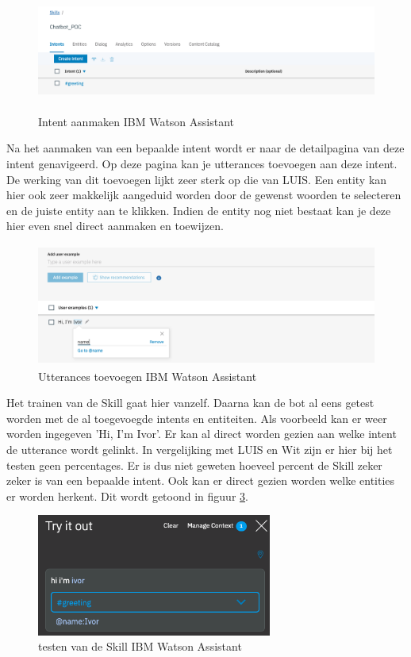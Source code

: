 \begin{figure}[h!]
	\centering
	\includegraphics[height=4cm]{img/ibm_intents.png}
	\caption{Intent aanmaken IBM Watson Assistant}
	\label{fig:intentsIbm}
\end{figure}

Na het aanmaken van een bepaalde intent wordt er naar de detailpagina van deze intent genavigeerd. Op deze pagina kan je utterances toevoegen aan deze intent. De werking van dit toevoegen lijkt zeer sterk op die van LUIS. Een entity kan hier ook zeer makkelijk aangeduid worden door de gewenst woorden te selecteren en de juiste entity aan te klikken. Indien de entity nog niet bestaat kan je deze hier even snel direct aanmaken en toewijzen.

\begin{figure}[h!]
	\centering
	\includegraphics[height=4cm]{img/imb_utterances.png}
	\caption{Utterances toevoegen IBM Watson Assistant}
	\label{fig:utterancesIbm}
\end{figure}

Het trainen van de Skill gaat hier vanzelf. Daarna kan de bot al eens getest worden met de al toegevoegde intents en entiteiten. Als voorbeeld kan er weer worden ingegeven 'Hi, I'm Ivor'. Er kan al direct worden gezien aan welke intent de utterance wordt gelinkt. In vergelijking met LUIS en Wit zijn er hier bij het testen geen percentages. Er is dus niet geweten hoeveel percent de Skill zeker zeker is van een bepaalde intent. Ook kan er direct gezien worden welke entities er worden herkent. Dit wordt getoond in figuur \ref{fig:tryIbm}.

\begin{figure}[h!]
	\centering
	\includegraphics[height=4cm]{img/ibm_try.png}
	\caption{testen van de Skill IBM Watson Assistant}
	\label{fig:tryIbm}
\end{figure}

